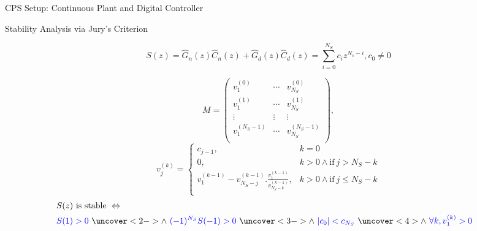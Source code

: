 \documentclass{beamer}
\begin{document}
\begin{frame}[fragile]{CPS Setup: Continuous Plant and Digital Controller}




\end{frame}

\begin{frame}{Stability Analysis via Jury's Criterion}

\begin{equation*}
S(z) = \hat{G}_n(z) \hat{C}_n(z)+\hat{G}_d(z) \hat{C}_d(z) = \sum_{i=0}^{N_S} c_iz^{N_s-i}, c_0 \neq 0 
\end{equation*}

$$
M=\left( 
\begin{array}{ccc}
v^{(0)}_{1} &\cdots & v^{(0)}_{N_S}\\
v^{(1)}_{1} &\cdots&  v^{(1)}_{N_S}\\
\vdots&\vdots&\vdots\\
v^{(N_S-1)}_{1} &\cdots&  v^{(N_S-1)}_{N_S}\\
\end{array}
\right), $$
%
$$
v_{j}^{(k)}=\left\{
\begin{array}{ll}
c_{j-1}, & k=0\\
0,&k>0 \wedge \mbox{if}~j>N_S-k\\
v_{1}^{(k-1)}-v_{N_S-j}^{(k-1)} . \frac{v_{1}^{(k-1)}}{v_{N_S-k}^{(k-1)}}, &k>0 \wedge  \mbox{if}~j\leq N_S-k\\
\end{array}
\right.
$$
%
\begin{eqnarray*}
&S(z) \text{ is stable } \Leftrightarrow& \\ 
&\textcolor{blue}{S(1) > 0}\ \uncover<2->{\wedge\ \textcolor{blue}{(-1)^{N_S} S(-1) > 0}}\ \uncover<3->{\wedge\ \textcolor{blue}{|c_0| < c_{N_S}}}\ \uncover<4>{\wedge\ \textcolor{blue}{\forall k, v_1^{(k)} > 0}}&
\end{eqnarray*}

\end{frame}
\end{document}
